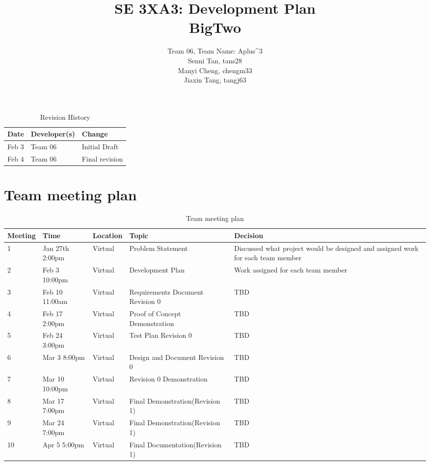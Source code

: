 \documentclass{article}
\title{SE 3XA3: Development Plan\\BigTwo}
\author{Team 06, Team Name: Aplus^3
		\\ Senni Tan, tans28
		\\ Manyi Cheng, chengm33
		\\ Jiaxin Tang, tangj63
}
\date{}
\begin{document}
\maketitle
\begin{table}[hp]
\caption{Revision History} \label{TblRevisionHistory}
\begin{tabularx}{\textwidth}{llX}
\toprule
\textbf{Date} & \textbf{Developer(s)} & \textbf{Change}\\
\midrule
Feb 3 & Team 06 & Initial Draft\\
Feb 4 & Team 06 & Final revision\\
\bottomrule
\end{tabularx}
\end{table}

\newpage


\section{Team meeting plan}

\begin{table}[h!]
    \begin{center}
    \begin{tabularx}{\textwidth}{|X|X|X|X|X|}
        \hline
         Meeting & Time & Location & Topic & Decision\\
        \hline
        1 & Jan 27th 2:00pm & Virtual & Problem Statement& Discussed what project would be designed and assigned work for each team member\\
        \hline
        2 & Feb 3 10:00pm & Virtual & Development Plan & Work assigned for each team member\\ 
        \hline
        3 & Feb 10 11:00am & Virtual & Requirements Document Revision 0 & TBD\\
        \hline
        4 & Feb 17 2:00pm & Virtual & Proof of Concept Demonstration & TBD\\
        \hline
        5 & Feb 24 3:00pm & Virtual & Test Plan Revision 0 & TBD\\
        \hline
        6 & Mar 3 8:00pm & Virtual & Design and Document Revision 0 & TBD\\
        \hline
        7 & Mar 10 10:00pm & Virtual & Revision 0 Demonstration & TBD\\
        \hline
        8 & Mar 17 7:00pm & Virtual & Final Demonstration(Revision 1) & TBD\\
        \hline
        9 & Mar 24 7:00pm & Virtual & Final Demonstration(Revision 1) & TBD\\
        \hline
        10 & Apr 5 5:00pm & Virtual & Final Documentation(Revision 1) & TBD\\
        \hline
        
    \end{tabularx}
    \caption{Team meeting plan}
    \label{tab:meeting plan}
    \end{center}
\end{table}
\end{document}
